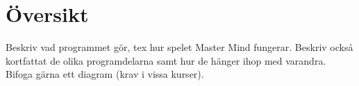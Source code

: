 \section{Översikt}
Beskriv vad programmet gör, tex hur spelet Master Mind fungerar. Beskriv också kortfattat de olika programdelarna samt hur de hänger ihop med varandra. Bifoga gärna ett diagram (krav i vissa kurser).
